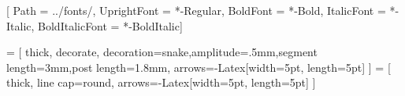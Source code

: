\usepackage{tikz}
\usepackage{fontawesome5}
\usepackage{fontspec}
\usepackage{color}
\usepackage{csquotes}
\usepackage{xspace}
\RequirePackage[scaled=.9]{FiraMono}
\usetikzlibrary{
    calc,
    arrows.meta,
    decorations.pathmorphing,
    positioning,
    shapes.geometric
}


\setmainfont{TeXGyreTermes}[
    Path = ../fonts/,
    UprightFont = *-Regular,
    BoldFont = *-Bold,
    ItalicFont = *-Italic,
    BoldItalicFont = *-BoldItalic]

 = [
  thick, decorate,
  decoration={snake,amplitude=.5mm,segment length=3mm,post length=1.8mm},
  arrows={-Latex[width=5pt, length=5pt]}
]
  = [
  thick, line cap=round,
  arrows={-Latex[width=5pt, length=5pt]}
]
